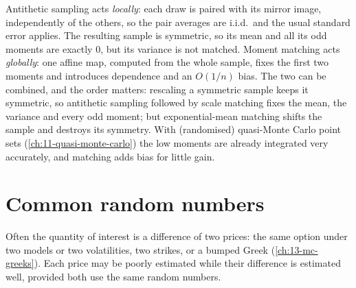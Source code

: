 \begin{remark}\label{rem:cv-anti-vs-mm}
Antithetic sampling acts \emph{locally}: each draw is paired with its mirror image,
independently of the others, so the pair averages are i.i.d.\ and the usual standard error
applies. The resulting sample is symmetric, so its mean and all its odd moments are exactly
$0$, but its variance is not matched. Moment matching acts \emph{globally}: one affine map,
computed from the whole sample, fixes the first two moments and introduces dependence and
an $O(1/n)$ bias. The two can be combined, and the order matters: rescaling a symmetric
sample keeps it symmetric, so antithetic sampling followed by scale matching fixes the mean,
the variance and every odd moment; but exponential-mean matching shifts the sample and
destroys its symmetry. With (randomised) quasi-Monte Carlo point sets
(\cref{ch:11-quasi-monte-carlo}) the low moments are already integrated very accurately, and
matching adds bias for little gain.
\end{remark}

\section{Common random numbers}\label{sec:cv-crn}

Often the quantity of interest is a difference of two prices: the same option under two
models or two volatilities, two strikes, or a bumped Greek (\cref{ch:13-mc-greeks}). Each
price may be poorly estimated while their difference is estimated well, provided both use
the same random numbers.

